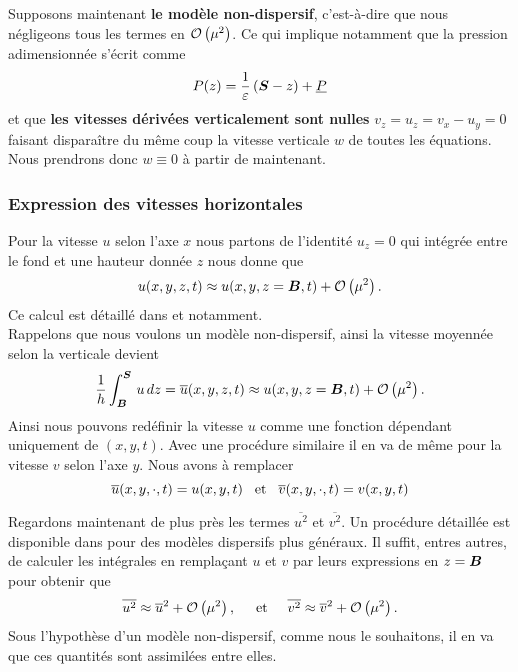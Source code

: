 \begin{refe}
\noindent Supposons maintenant\textbf{ le modèle non-dispersif}, c'est-à-dire que nous négligeons tous les termes en $\mathcal{O}\left(\mu^2\right)$. Ce qui implique notamment que la pression adimensionnée s'écrit comme
\begin{equation}
	P(z) =  \frac{1}{\varepsilon}\left(\boldsymbol{S} - z\right) +\underline{P} 
\end{equation}
et que \textbf{les vitesses dérivées verticalement sont nulles} $v_z = u_z = v_x - u_y = 0$ faisant disparaître du même coup la vitesse verticale $w$ de toutes les équations. Nous prendrons donc $w\equiv0$ à partir de maintenant.
\end{refe}

\subsubsection{Expression des vitesses horizontales}

\noindent Pour la vitesse $u$ selon l'axe $x$ nous partons de l'identité $u_z = 0$ qui intégrée entre le fond et une hauteur donnée $z$ nous donne que
\begin{equation}
	u(x, y, z, t) \approx u(x, y, z = \boldsymbol{B}, t) + \mathcal{O}\left(\mu^2\right).
\end{equation}
Ce calcul est détaillé dans \citet{Pons2018} et \citet{bosi_spectral_2019} notamment.\\
Rappelons que nous voulons un modèle non-dispersif, ainsi la vitesse moyennée selon la verticale devient
\begin{equation}
	 \frac{1}{h}\int_{\boldsymbol{B}}^{\boldsymbol{S}}\,u\,dz = \overline{u}(x, y, z, t) \approx u(x, y, z = \boldsymbol{B}, t) + \mathcal{O}\left(\mu^2\right).
\end{equation}
Ainsi nous pouvons redéfinir la vitesse $u$ comme une fonction dépendant uniquement de $(x, y, t)$. Avec une procédure similaire il en va de même pour la vitesse $v$ selon l'axe $y$. Nous avons à remplacer 
\begin{equation}
	\overline{u}(x, y, \cdot, t) = u(x, y, t) \hspace{3mm}\text{et}\hspace{3mm}\overline{v}(x, y, \cdot, t) = v(x, y, t)
\end{equation}

\noindent Regardons maintenant de plus près les termes $\overline{u^2}$ et $\overline{v^2}$. Un procédure détaillée est disponible dans \citet{Pons2018} pour des modèles dispersifs plus généraux. Il suffit, entres autres, de calculer les intégrales en remplaçant $u$ et $v$ par leurs expressions en $z=\boldsymbol{B}$ pour obtenir que 
\begin{equation}
	\overline{u^2} \approx \overline{u}^2 + \mathcal{O}\left(\mu^2\right), \hspace{5mm}\text{et}\hspace{5mm} \overline{v^2} \approx \overline{v}^2 + \mathcal{O}\left(\mu^2\right).
\end{equation}
Sous l'hypothèse d'un modèle non-dispersif, comme nous le souhaitons, il en va que ces quantités sont assimilées entre elles.

